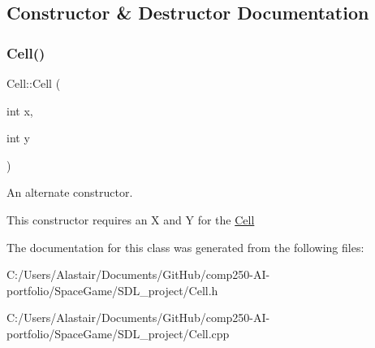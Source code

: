 \subsection{Constructor \& Destructor Documentation}
\mbox{\label{class_cell_aa39ad04eeebb7bf00d592ad36640337e}} 
\subsubsection{\texorpdfstring{Cell()}{Cell()}}
{\footnotesize\ttfamily Cell\+::\+Cell (\begin{DoxyParamCaption}\item[{int}]{x,  }\item[{int}]{y }\end{DoxyParamCaption})}



An alternate constructor. 

This constructor requires an X and Y for the \hyperlink{class_cell}{Cell} 

The documentation for this class was generated from the following files\+:\begin{DoxyCompactItemize}
\item 
C\+:/\+Users/\+Alastair/\+Documents/\+Git\+Hub/comp250-\/\+A\+I-\/portfolio/\+Space\+Game/\+S\+D\+L\+\_\+project/Cell.\+h\item 
C\+:/\+Users/\+Alastair/\+Documents/\+Git\+Hub/comp250-\/\+A\+I-\/portfolio/\+Space\+Game/\+S\+D\+L\+\_\+project/Cell.\+cpp\end{DoxyCompactItemize}
